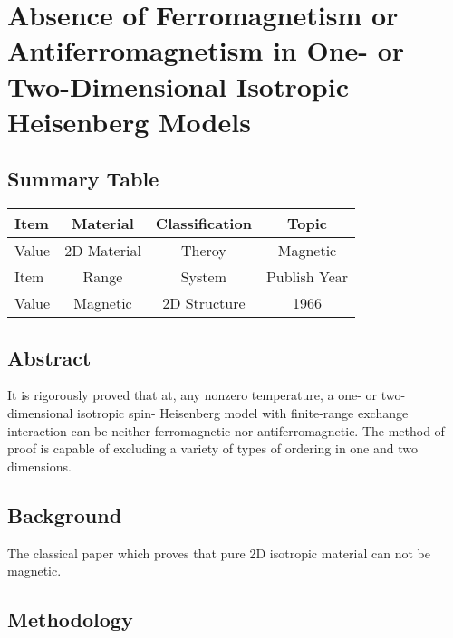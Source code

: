 \setchapterpreamble[u]{\margintoc}
\chapter{Absence of Ferromagnetism or Antiferromagnetism in One- or Two-Dimensional Isotropic Heisenberg Models\cite{PhysRevLett.17.1133}}

\section{Summary Table}

\begin{table}[h]
    \begin{tabular}{lccc}
    \hline
    Item  & Material         & Classification & Topic        \\  \hline
    Value & 2D Material      & Theroy         & Magnetic     \\  \hline
    Item  & Range            & System         & Publish Year \\  \hline
    Value & Magnetic         & 2D Structure   & 1966         \\  \hline
    \end{tabular}
\end{table}

\section{Abstract}
It is rigorously proved that at, any nonzero temperature, a one- or two-dimensional isotropic spin- Heisenberg model with finite-range exchange interaction can be neither ferromagnetic nor antiferromagnetic. The method of proof is capable of excluding a variety of types of ordering in one and two dimensions.

\section{Background}
The classical paper which proves that pure 2D isotropic material can not be magnetic.

\section{Methodology}


